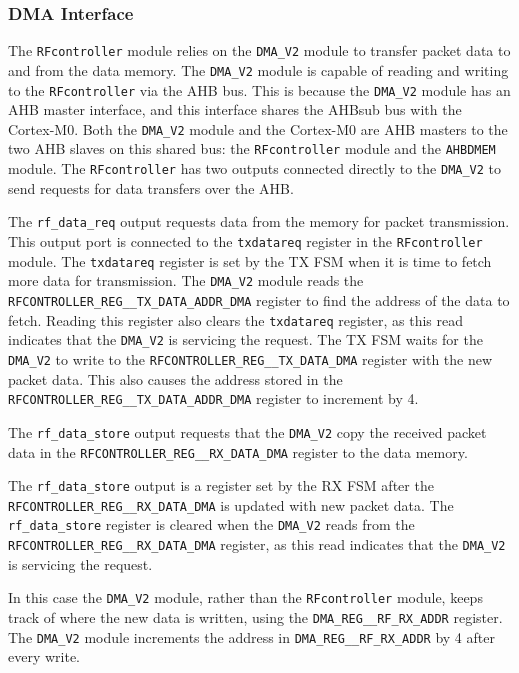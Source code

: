 \subsubsection{DMA Interface}
The \texttt{RFcontroller} module relies on the \texttt{DMA\_V2} module to transfer packet data to and from the data memory. The \texttt{DMA\_V2} module is capable of reading and writing to the \texttt{RFcontroller} via the AHB bus. This is because the \texttt{DMA\_V2} module has an AHB master interface, and this interface shares the AHBsub bus with the Cortex-M0. Both the \texttt{DMA\_V2} module and the Cortex-M0 are AHB masters to the two AHB slaves on this shared bus: the \texttt{RFcontroller} module and the \texttt{AHBDMEM} module. The \texttt{RFcontroller} has two outputs connected directly to the \texttt{DMA\_V2} to send requests for data transfers over the AHB.

The \texttt{rf\_data\_req} output requests data from the memory for packet transmission. This output port is connected to the \texttt{txdatareq} register in the \texttt{RFcontroller} module. The \texttt{txdatareq} register is set by the TX FSM when it is time to fetch more data for transmission. The \texttt{DMA\_V2} module reads the \texttt{RFCONTROLLER\_REG\_\_TX\_DATA\-\_ADDR\_DMA} register to find the address of the data to fetch. Reading this register also clears the \texttt{txdatareq} register, as this read indicates that the \texttt{DMA\_V2} is servicing the request. The TX FSM waits for the \texttt{DMA\_V2} to write to the \texttt{RFCONTROLLER\_REG\_\_TX\-\_DATA\_DMA} register with the new packet data. This also causes the address stored in the \texttt{RFCONTROLLER\_REG\_\_TX\_DATA\_ADDR\_DMA} register to increment by 4.

The \texttt{rf\_data\_store} output requests that the \texttt{DMA\_V2} copy the received packet data in the \texttt{RFCONTROLLER\_REG\_\_RX\_DATA\_DMA} register to the data memory. 

The \texttt{rf\_data\_store} output is a register set by the RX FSM after the \texttt{RFCONTR\-O\-L\-L\-E\-R\-\_REG\_\_RX\_DATA\_DMA} is updated with new packet data. The \texttt{rf\_data\_store} register is cleared when the \texttt{DMA\_V2} reads from the \texttt{RFCONTR\-O\-L\-L\-E\-R\-\_REG\_\_RX\_DATA\_DMA} register, as this read indicates that the \texttt{DMA\_V2} is servicing the request.

In this case the \texttt{DMA\_V2} module, rather than the \texttt{RFcontroller} module, keeps track of where the new data is written, using the \texttt{DMA\_REG\_\_RF\_RX\_ADDR} register. The \texttt{DMA\_V2} module increments the address in \texttt{DMA\_REG\_\_RF\_RX\_ADDR} by 4 after every write.

